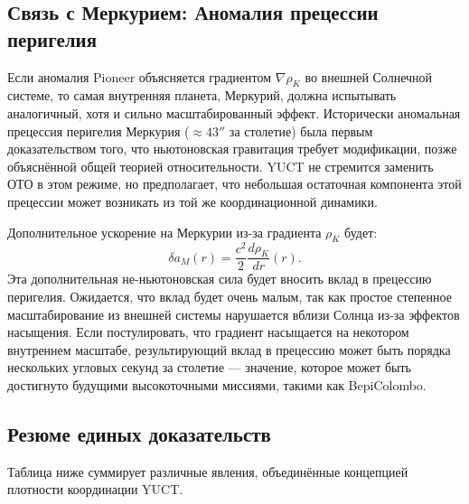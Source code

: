 \documentclass[12pt,a4paper]{article}
\theoremstyle{remark}
\begin{document}
	\subsection{Связь с Меркурием: Аномалия прецессии перигелия}
	\label{subsec:coord:mercury}
	
	Если аномалия Pioneer объясняется градиентом $\nabla \rho_K$ во внешней Солнечной системе, то самая внутренняя планета, Меркурий, должна испытывать аналогичный, хотя и сильно масштабированный эффект. Исторически аномальная прецессия перигелия Меркурия ($\approx 43''$ за столетие) была первым доказательством того, что ньютоновская гравитация требует модификации, позже объяснённой общей теорией относительности. YUCT не стремится заменить ОТО в этом режиме, но предполагает, что небольшая остаточная компонента этой прецессии может возникать из той же координационной динамики.
	
	Дополнительное ускорение на Меркурии из-за градиента $\rho_K$ будет:
	\begin{equation}
		\delta a_M(r) = \frac{c^2}{2} \frac{d\rho_K}{dr}(r).
	\end{equation}
	Эта дополнительная не-ньютоновская сила будет вносить вклад в прецессию перигелия. Ожидается, что вклад будет очень малым, так как простое степенное масштабирование из внешней системы нарушается вблизи Солнца из-за эффектов насыщения. Если постулировать, что градиент насыщается на некотором внутреннем масштабе, результирующий вклад в прецессию может быть порядка нескольких угловых секунд за столетие — значение, которое может быть достигнуто будущими высокоточными миссиями, такими как BepiColombo.
	
	\subsection{Резюме единых доказательств}
	
	Таблица ниже суммирует различные явления, объединённые концепцией плотности координации YUCT.
	
\end{document}
